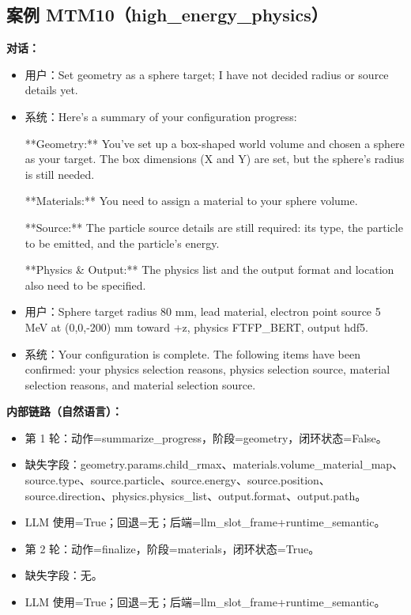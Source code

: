 \documentclass[11pt]{ctexart}
\begin{document}
\subsection{案例 MTM10（high\_energy\_physics）}
\textbf{对话：}
\begin{itemize}
\item 用户：Set geometry as a sphere target; I have not decided radius or source details yet.
\item 系统：Here's a summary of your configuration progress:

**Geometry:** You've set up a box-shaped world volume and chosen a sphere as your target. The box dimensions (X and Y) are set, but the sphere's radius is still needed.

**Materials:** You need to assign a material to your sphere volume.

**Source:** The particle source details are still required: its type, the particle to be emitted, and the particle's energy.

**Physics \& Output:** The physics list and the output format and location also need to be specified.
\item 用户：Sphere target radius 80 mm, lead material, electron point source 5 MeV at (0,0,-200) mm toward +z, physics FTFP\_BERT, output hdf5.
\item 系统：Your configuration is complete. The following items have been confirmed: your physics selection reasons, physics selection source, material selection reasons, and material selection source.
\end{itemize}
\textbf{内部链路（自然语言）：}
\begin{itemize}
\item 第 1 轮：动作=summarize\_progress，阶段=geometry，闭环状态=False。
\item 缺失字段：geometry.params.child\_rmax、materials.volume\_material\_map、source.type、source.particle、source.energy、source.position、source.direction、physics.physics\_list、output.format、output.path。
\item LLM 使用=True；回退=无；后端=llm\_slot\_frame+runtime\_semantic。
\item 第 2 轮：动作=finalize，阶段=materials，闭环状态=True。
\item 缺失字段：无。
\item LLM 使用=True；回退=无；后端=llm\_slot\_frame+runtime\_semantic。
\end{itemize}
\end{document}
